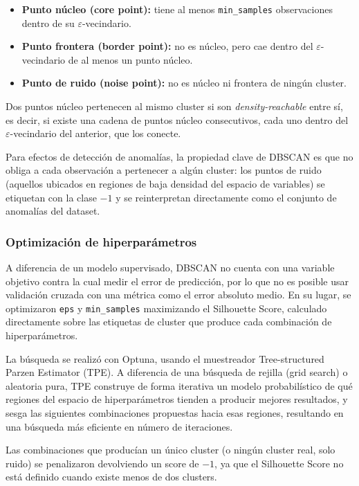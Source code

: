 \documentclass[11pt]{article}
\begin{document}
\begin{itemize}
    \item \textbf{Punto núcleo (core point):} tiene al menos \texttt{min\_samples} observaciones dentro de su $\varepsilon$-vecindario.
    \item \textbf{Punto frontera (border point):} no es núcleo, pero cae dentro del $\varepsilon$-vecindario de al menos un punto núcleo.
    \item \textbf{Punto de ruido (noise point):} no es núcleo ni frontera de ningún cluster.
\end{itemize}

Dos puntos núcleo pertenecen al mismo cluster si son \textit{density-reachable} entre sí, es decir, si existe una
cadena de puntos núcleo consecutivos, cada uno dentro del $\varepsilon$-vecindario del anterior, que los conecte.

Para efectos de detección de anomalías, la propiedad clave de DBSCAN es que no obliga a cada
observación a pertenecer a algún cluster: los puntos de ruido (aquellos ubicados en regiones de baja
densidad del espacio de variables) se etiquetan con la clase $-1$ y se reinterpretan directamente como el
conjunto de anomalías del dataset.

\subsubsection*{Optimización de hiperparámetros}

A diferencia de un modelo supervisado, DBSCAN no cuenta con una variable objetivo contra la cual medir
el error de predicción, por lo que no es posible usar validación cruzada con una métrica como el error
absoluto medio. En su lugar, se optimizaron \texttt{eps} y \texttt{min\_samples} maximizando el Silhouette Score,
calculado directamente sobre las etiquetas de cluster que produce cada combinación de hiperparámetros.

La búsqueda se realizó con Optuna, usando el muestreador Tree-structured Parzen Estimator (TPE). A
diferencia de una búsqueda de rejilla (grid search) o aleatoria pura, TPE construye de forma iterativa un
modelo probabilístico de qué regiones del espacio de hiperparámetros tienden a producir mejores
resultados, y sesga las siguientes combinaciones propuestas hacia esas regiones, resultando en una
búsqueda más eficiente en número de iteraciones.

Las combinaciones que producían un único cluster (o ningún cluster real, solo ruido) se penalizaron
devolviendo un score de $-1$, ya que el Silhouette Score no está definido cuando existe menos de dos
clusters.
\end{document}
